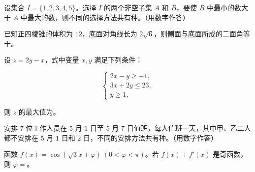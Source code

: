 \begin{question}
设集合 $I=\{1,2,3,4,5\}$。选择 $I$ 的两个非空子集 $A$ 和 $B$，要使 $B$ 中最小的数大于 $A$ 中最大的数，则不同的选择方法共有\gkblank{}种。（用数字作答）

\end{question}
\begin{question}
已知正四棱锥的体积为 $12$，底面对角线长为 $2\sqrt6$，则侧面与底面所成的二面角等于\gkblank{}。

\end{question}
\begin{question}
设 $z=2y-x$，式中变量 $x,y$ 满足下列条件：

\nopagebreak[4]
\[
\begin{cases}
2x-y\geqslant-1,\\
3x+2y\leqslant23,\\
y\geqslant1,
\end{cases}
\]

则 $z$ 的最大值为\gkblank{}。

\end{question}
\begin{question}
安排 $7$ 位工作人员在 $5$ 月 $1$ 日至 $5$ 月 $7$ 日值班，每人值班一天，其中甲、乙二人都不安排在 $5$ 月 $1$ 日和 $2$ 日，不同的安排方法共有\gkblank{}种。（用数字作答）

\end{question}
\begin{question}
函数 $f(x)=\cos(\sqrt3x+\varphi)\ (0<\varphi<\pi)$。若 $f(x)+f'(x)$ 是奇函数，则 $\varphi=$\gkblank{}。

\end{question}

